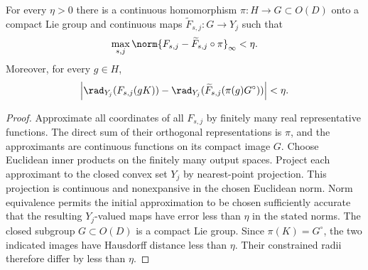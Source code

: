 \begin{lemma}\label{lem:Lieapprox55}
For every $\eta>0$ there is a continuous homomorphism $\pi:H\to G\subset O(D)$ onto a compact Lie group and continuous maps $\widetilde F_{s,j}:G\to Y_j$ such that
\[
           \max_{s,j}\norm{F_{s,j}-\widetilde F_{s,j}\circ\pi}_\infty<\eta.
\]
Moreover, for every $g\in H$,
\[
 \left|\rad_{Y_j}(F_{s,j}(gK))-
 \rad_{Y_j}(\widetilde F_{s,j}(\pi(g)G^\circ))\right|<\eta.
\]
\end{lemma}
\begin{proof}
Approximate all coordinates of all $F_{s,j}$ by finitely many real representative functions. The direct sum of their orthogonal representations is $\pi$, and the approximants are continuous functions on its compact image $G$. Choose Euclidean inner products on the finitely many output spaces. Project each approximant to the closed convex set $Y_j$ by nearest-point projection. This projection is continuous and nonexpansive in the chosen Euclidean norm. Norm equivalence permits the initial approximation to be chosen sufficiently accurate that the resulting $Y_j$-valued maps have error less than $\eta$ in the stated norms. The closed subgroup $G\subset O(D)$ is a compact Lie group. Since $\pi(K)=G^\circ$, the two indicated images have Hausdorff distance less than $\eta$. Their constrained radii therefore differ by less than $\eta$.
\end{proof}

